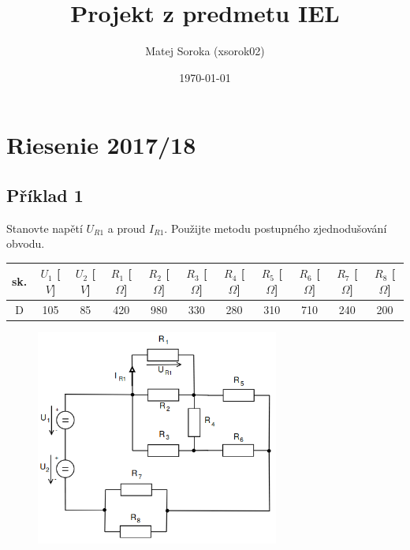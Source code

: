\documentclass[a4paper,oneside,12pt]{article}
\author{Matej Soroka (xsorok02)}
\date{\today}
\title{Projekt z predmetu IEL}
\begin{document}
	\maketitle
	\newpage

	\tableofcontents
	\newpage

	\section{Riesenie 2017/18}
	\maketitle

	\subsection{Příklad 1}

	Stanovte napětí $U_{R1}$ a proud $I_{R1}$. Použijte metodu postupného
	zjednodušování obvodu.

	\begin{table}[h]
		\begin{center}
			\begin{tabular}{|c|c|c|c|c|c|c|c|c|c|c|}
				\hline
				sk. & $U_{1}$ [$V$] & $U_{2}$ [$V$] & $R_{1}$ [$\Omega$] & $R_{2}$ [$\Omega$] & $R_{3}$ [$\Omega$] & $R_{4}$ [$\Omega$] & $R_{5}$ [$\Omega$] & $R_{6}$ [$\Omega$] & $R_{7}$ [$\Omega$] & $R_{8}$ [$\Omega$] \\
				\hline
				D & 105 & 85 & 420 & 980 & 330 & 280 & 310 & 710 & 240 & 200 \\
				\hline
			\end{tabular}
		\end{center}
	\end{table}

	\begin{figure}[h]
		\begin{center}
			\includegraphics[width=8cm,keepaspectratio]{img/pr1.png}
		\end{center}
	\end{figure}
\end{document}
